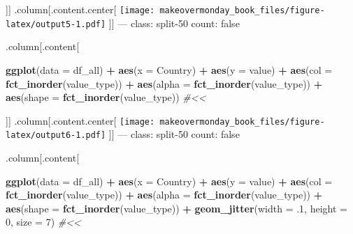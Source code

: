 \documentclass[]{book}
\newenvironment{Shaded}{\begin{snugshade}}{\end{snugshade}}
\newcommand{\KeywordTok}[1]{\textcolor[rgb]{0.13,0.29,0.53}{\textbf{#1}}}
\newcommand{\DataTypeTok}[1]{\textcolor[rgb]{0.13,0.29,0.53}{#1}}
\newcommand{\DecValTok}[1]{\textcolor[rgb]{0.00,0.00,0.81}{#1}}
\newcommand{\StringTok}[1]{\textcolor[rgb]{0.31,0.60,0.02}{#1}}
\newcommand{\CommentTok}[1]{\textcolor[rgb]{0.56,0.35,0.01}{\textit{#1}}}
\newcommand{\OperatorTok}[1]{\textcolor[rgb]{0.81,0.36,0.00}{\textbf{#1}}}
\newcommand{\NormalTok}[1]{#1}
\theoremstyle{definition}
\theoremstyle{definition}
\theoremstyle{definition}
\theoremstyle{remark}
\begin{document}
{]}{]} .column{[}.content.center{[}
\texttt{[image: makeovermonday\_book\_files/figure-latex/output5-1.pdf]}
{]}{]} --- class: split-50 count: false

.column{[}.content{[}

\begin{Shaded}
\begin{Highlighting}[]
\KeywordTok{ggplot}\NormalTok{(}\DataTypeTok{data =}\NormalTok{ df_all) }\OperatorTok{+}
\StringTok{  }\KeywordTok{aes}\NormalTok{(}\DataTypeTok{x =}\NormalTok{ Country) }\OperatorTok{+}
\StringTok{  }\KeywordTok{aes}\NormalTok{(}\DataTypeTok{y =}\NormalTok{ value) }\OperatorTok{+}
\StringTok{  }\KeywordTok{aes}\NormalTok{(}\DataTypeTok{col =} \KeywordTok{fct_inorder}\NormalTok{(value_type)) }\OperatorTok{+}
\StringTok{  }\KeywordTok{aes}\NormalTok{(}\DataTypeTok{alpha =} \KeywordTok{fct_inorder}\NormalTok{(value_type)) }\OperatorTok{+}
\StringTok{  }\KeywordTok{aes}\NormalTok{(}\DataTypeTok{shape =} \KeywordTok{fct_inorder}\NormalTok{(value_type))  }\CommentTok{#<<}
\end{Highlighting}
\end{Shaded}

{]}{]} .column{[}.content.center{[}
\texttt{[image: makeovermonday\_book\_files/figure-latex/output6-1.pdf]}
{]}{]} --- class: split-50 count: false

.column{[}.content{[}

\begin{Shaded}
\begin{Highlighting}[]
\KeywordTok{ggplot}\NormalTok{(}\DataTypeTok{data =}\NormalTok{ df_all) }\OperatorTok{+}
\StringTok{  }\KeywordTok{aes}\NormalTok{(}\DataTypeTok{x =}\NormalTok{ Country) }\OperatorTok{+}
\StringTok{  }\KeywordTok{aes}\NormalTok{(}\DataTypeTok{y =}\NormalTok{ value) }\OperatorTok{+}
\StringTok{  }\KeywordTok{aes}\NormalTok{(}\DataTypeTok{col =} \KeywordTok{fct_inorder}\NormalTok{(value_type)) }\OperatorTok{+}
\StringTok{  }\KeywordTok{aes}\NormalTok{(}\DataTypeTok{alpha =} \KeywordTok{fct_inorder}\NormalTok{(value_type)) }\OperatorTok{+}
\StringTok{  }\KeywordTok{aes}\NormalTok{(}\DataTypeTok{shape =} \KeywordTok{fct_inorder}\NormalTok{(value_type)) }\OperatorTok{+}
\StringTok{  }\KeywordTok{geom_jitter}\NormalTok{(}\DataTypeTok{width =}\NormalTok{ .}\DecValTok{1}\NormalTok{, }\DataTypeTok{height =} \DecValTok{0}\NormalTok{, }\DataTypeTok{size =} \DecValTok{7}\NormalTok{)  }\CommentTok{#<<}
\end{Highlighting}
\end{Shaded}
\end{document}

